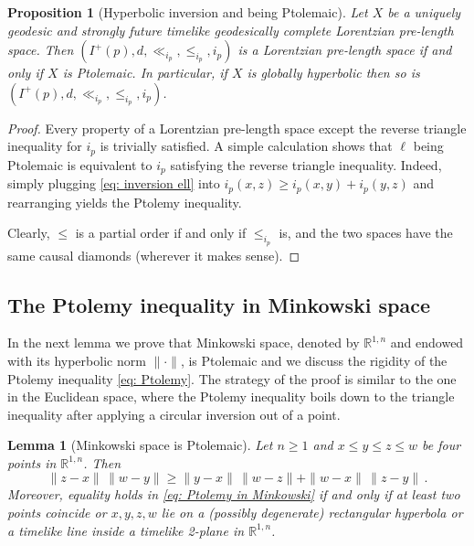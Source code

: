 \documentclass[hidelinks,12pt,a4paper]{article}
\numberwithin{equation}{section}
\theoremstyle{plain}
\newtheorem{proposition}[definition]{Proposition}
\newtheorem{lemma}[definition]{Lemma}
\theoremstyle{definition}
\newcommand{\LpLS}{Lo\-rentz\-ian pre-length space }
\newcommand{\LpLSn}{Lo\-rentz\-ian pre-length space}
\begin{document}
\begin{proposition}[Hyperbolic inversion and being Ptolemaic]
Let $X$ be a uniquely geodesic and strongly future timelike geodesically complete \LpLSn. 
Then $(I^+(p),d, \ll_{i_p}, \leq_{i_p}, i_p)$ is a \LpLS if and only if $X$ is Ptolemaic. 
In particular, if $X$ is globally hyperbolic then so is $(I^+(p),d, \ll_{i_p}, \leq_{i_p}, i_p)$. 
\end{proposition}
\begin{proof}
Every property of a \LpLS except the reverse triangle inequality for $i_p$ is trivially satisfied. 
A simple calculation shows that $\ell$ being Ptolemaic is equivalent to $i_p$ satisfying the reverse triangle inequality. 
Indeed, simply plugging \eqref{eq: inversion ell} into $i_p(x,z) \geq i_p(x,y) + i_p(y,z)$ and rearranging yields the Ptolemy inequality. 

Clearly, $\leq$ is a partial order if and only if $\leq_{i_p}$ is, and the two spaces have the same causal diamonds (wherever it makes sense). 
\end{proof}

\subsection{The Ptolemy inequality in Minkowski space}

In the next lemma we prove that Minkowski space, denoted by $\mathbb R^{1,n}$ and endowed with its hyperbolic norm $\| \cdot \|$, is Ptolemaic and we discuss the rigidity of the Ptolemy inequality \eqref{eq: Ptolemy}. The strategy of the proof is similar to the one in the Euclidean space, where the Ptolemy inequality boils down to the triangle inequality after applying a circular inversion out of a point.

\begin{lemma}[Minkowski space is Ptolemaic]
\label{lem: Minkowski is Ptolemy}
Let $n \geq 1$ and $x \leq y \leq z \leq w$ be four points in $\mathbb R^{1,n}$. 
Then 
\begin{equation} 
\label{eq: Ptolemy in Minkowski}
\| z-x \| \, \| w-y \| \geq \| y-x \| \, \| w-z \| + \| w-x \| \, \|z-y\| \, .
\end{equation}
Moreover, equality holds in \eqref{eq: Ptolemy in Minkowski} if and only if at least two points coincide or $x,y,z,w$ lie on a (possibly degenerate) rectangular hyperbola or a timelike line inside a timelike \emph{2}-plane in $\mathbb R^{1,n}$.
\end{lemma}
\end{document}
